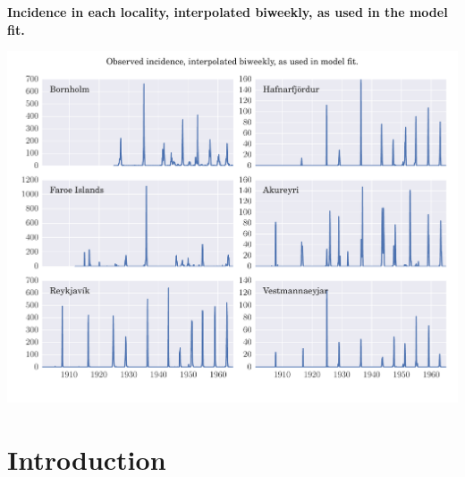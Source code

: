 \documentclass[10pt]{article}
\begin{document}
\textbf{Incidence in each locality, interpolated biweekly, as used in the model fit.}

\begin{center}
\includegraphics[width=\textwidth]{supp1.pdf}
\end{center}










\section*{Introduction}
\end{document}

